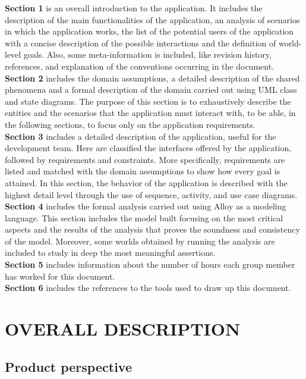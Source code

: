 \documentclass[a4paper]{article}
\begin{document}
\textbf{Section 1} is an overall introduction to the application. It
includes the description of the main functionalities of the application,
an analysis of scenarios in which the application works, the list of the
potential users of the application with a concise description of the
possible interactions and the definition of world-level goals. Also,
some meta-information is included, like revision history, references,
and explanation of the conventions occurring in the document.
\medskip\\
\textbf{Section 2} includes the domain assumptions, a detailed
description of the shared phenomena and a formal description of the
domain carried out using UML class and state diagrams. The purpose of
this section is to exhaustively describe the entities and the scenarios
that the application must interact with, to be able, in the following
sections, to focus only on the application requirements.
\medskip\\
\textbf{Section 3} includes a detailed description of the application,
useful for the development team. Here are classified the interfaces
offered by the application, followed by requirements and constraints.
More specifically, requirements are listed and matched with the domain
assumptions to show how every goal is attained. In this section, the
behavior of the application is described with the highest detail level
through the use of sequence, activity, and use case diagrams.
\medskip\\
\textbf{Section 4} includes the formal analysis carried out using Alloy
as a modeling language. This section includes the model built focusing
on the most critical aspects and the results of the analysis that proves
the soundness and consistency of the model. Moreover, some worlds
obtained by running the analysis are included to study in deep the most
meaningful assertions.
\medskip\\
\textbf{Section 5} includes information about the number of hours each
group member has worked for this document.
\medskip\\
\textbf{Section 6} includes the references to the tools used to draw up
this document.

\newpage

\section{OVERALL DESCRIPTION}\label{overall_description}

\subsection{Product perspective}
\end{document}
